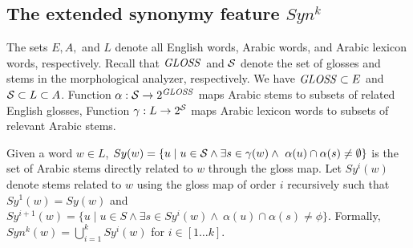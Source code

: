 

\subsection{The extended synonymy feature $Syn^k$}
\label{subsec:synk} 

The sets $E, A,$ and $L$ denote all English words, Arabic words, 
and Arabic lexicon words, respectively.
Recall that $\mathit{GLOSS}$ and $\ss$ denote the set of glosses and stems in the morphological analyzer, respectively.
We have $\mathit{GLOSS} \subset E$ and $\ss \subset L \subset A$. 
Function $\alpha: \ss \rightarrow 2^{\GG}$ maps Arabic stems to 
subsets of related English glosses, %
Function $\gamma: L \rightarrow 2^{\ss}$ maps Arabic lexicon words to subsets 
of relevant Arabic stems. %

Given a word $w\in L$, 
$Sy(w)=\{u\mid u\in \ss \land\exists s\in \gamma(w)\land~\alpha(u)\cap\alpha(s)\neq\emptyset\}$
is the set of Arabic stems 
directly related to $w$ through the gloss map.
%
Let $Sy^{i}(w)$ denote stems related to $w$ using the gloss map of order $i$ recursively such that
$Sy^{1}(w) = Sy(w)$ and
$Sy^{i+1}(w)=\{u\mid u\in S\land\exists s\in Sy^{i}(w)\land~\alpha(u)\cap\alpha(s)\neq\phi\}$.
Formally, $Syn^k(w) = \bigcup\limits_{i=1}^{k} Sy^{i}(w)$ for $i\in[1 \ldots k]$.
%

